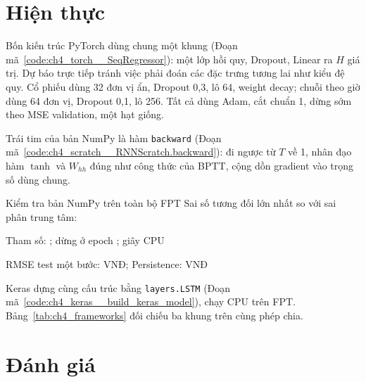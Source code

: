 
\section{Hiện thực}
Bốn kiến trúc PyTorch dùng chung một khung (Đoạn mã~\ref{code:ch4_torch__SeqRegressor}): một lớp hồi quy, Dropout, Linear ra $H$ giá trị. Dự báo trực tiếp tránh việc phải đoán các đặc trưng tương lai như kiểu đệ quy. Cổ phiếu dùng 32 đơn vị ẩn, Dropout 0,3, lô 64, weight decay; chuỗi theo giờ dùng 64 đơn vị, Dropout 0,1, lô 256. Tất cả dùng Adam, cắt chuẩn 1, dừng sớm theo MSE validation, một hạt giống.


Trái tim của bản NumPy là hàm \texttt{backward} (Đoạn mã~\ref{code:ch4_scratch__RNNScratch.backward}): đi ngược từ $T$ về 1, nhân đạo hàm $\tanh$ và $W_{hh}$ đúng như công thức của BPTT, cộng dồn gradient vào trọng số dùng chung.


\begin{ketqua}{Kiểm tra bản NumPy trên toàn bộ FPT}
Sai số tương đối lớn nhất so với sai phân trung tâm: \par
Tham số: ; dừng ở epoch ;  giây CPU\par
RMSE test một bước:  VNĐ; Persistence:  VNĐ
\end{ketqua}

Keras dựng cùng cấu trúc bằng \texttt{layers.LSTM} (Đoạn mã~\ref{code:ch4_keras__build_keras_model}), chạy CPU trên FPT. Bảng~\ref{tab:ch4_frameworks} đối chiếu ba khung trên cùng phép chia.


\section{Đánh giá}
